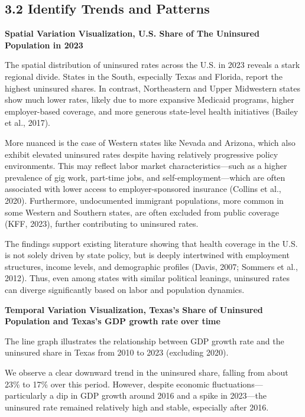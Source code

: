 \documentclass[
]{article}
\begin{document}
\subsection{3.2 Identify Trends and
Patterns}\label{identify-trends-and-patterns}

\textbf{Spatial Variation Visualization, U.S. Share of The Uninsured
Population in 2023}

The spatial distribution of uninsured rates across the U.S. in 2023
reveals a stark regional divide. States in the South, especially Texas
and Florida, report the highest uninsured shares. In contrast,
Northeastern and Upper Midwestern states show much lower rates, likely
due to more expansive Medicaid programs, higher employer-based coverage,
and more generous state-level health initiatives (Bailey et al., 2017).

More nuanced is the case of Western states like Nevada and Arizona,
which also exhibit elevated uninsured rates despite having relatively
progressive policy environments. This may reflect labor market
characteristics---such as a higher prevalence of gig work, part-time
jobs, and self-employment---which are often associated with lower access
to employer-sponsored insurance (Collins et al., 2020). Furthermore,
undocumented immigrant populations, more common in some Western and
Southern states, are often excluded from public coverage (KFF, 2023),
further contributing to uninsured rates.

The findings support existing literature showing that health coverage in
the U.S. is not solely driven by state policy, but is deeply intertwined
with employment structures, income levels, and demographic profiles
(Davis, 2007; Sommers et al., 2012). Thus, even among states with
similar political leanings, uninsured rates can diverge significantly
based on labor and population dynamics.

\textbf{Temporal Variation Visualization, Texas's Share of Uninsured
Population and Texas's GDP growth rate over time}

The line graph illustrates the relationship between GDP growth rate and
the uninsured share in Texas from 2010 to 2023 (excluding 2020).

We observe a clear downward trend in the uninsured share, falling from
about 23\% to 17\% over this period. However, despite economic
fluctuations---particularly a dip in GDP growth around 2016 and a spike
in 2023---the uninsured rate remained relatively high and stable,
especially after 2016.
\end{document}
